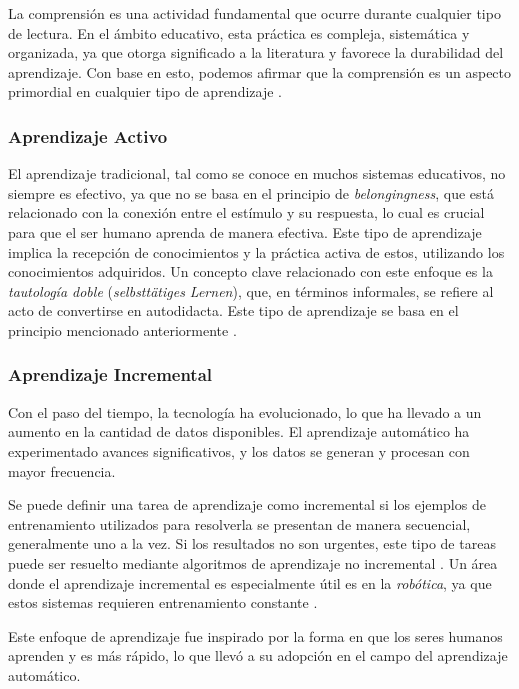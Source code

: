 La comprensión es una actividad fundamental que ocurre durante cualquier tipo de lectura. En el ámbito educativo, esta práctica es compleja, sistemática y organizada, ya que otorga significado a la literatura y favorece la durabilidad del aprendizaje. Con base en esto, podemos afirmar que la comprensión es un aspecto primordial en cualquier tipo de aprendizaje \cite{perez2014}.

\subsubsection{Aprendizaje Activo}

El aprendizaje tradicional, tal como se conoce en muchos sistemas educativos, no siempre es efectivo, ya que no se basa en el principio de \textit{belongingness}, que está relacionado con la conexión entre el estímulo y su respuesta, lo cual es crucial para que el ser humano aprenda de manera efectiva. Este tipo de aprendizaje implica la recepción de conocimientos y la práctica activa de estos, utilizando los conocimientos adquiridos. Un concepto clave relacionado con este enfoque es la \textit{tautología doble} (\textit{selbstt\"atiges Lernen}), que, en términos informales, se refiere al acto de convertirse en autodidacta. Este tipo de aprendizaje se basa en el principio mencionado anteriormente \cite{Huber2008}.

\subsubsection{Aprendizaje Incremental}

Con el paso del tiempo, la tecnología ha evolucionado, lo que ha llevado a un aumento en la cantidad de datos disponibles. El aprendizaje automático ha experimentado avances significativos, y los datos se generan y procesan con mayor frecuencia.

Se puede definir una tarea de aprendizaje como incremental si los ejemplos de entrenamiento utilizados para resolverla se presentan de manera secuencial, generalmente uno a la vez. Si los resultados no son urgentes, este tipo de tareas puede ser resuelto mediante algoritmos de aprendizaje no incremental \cite{GiraudCarrier2000}. Un área donde el aprendizaje incremental es especialmente útil es en la \textit{robótica}, ya que estos sistemas requieren entrenamiento constante \cite{GiraudCarrier2000}.

Este enfoque de aprendizaje fue inspirado por la forma en que los seres humanos aprenden y es más rápido, lo que llevó a su adopción en el campo del aprendizaje automático.


